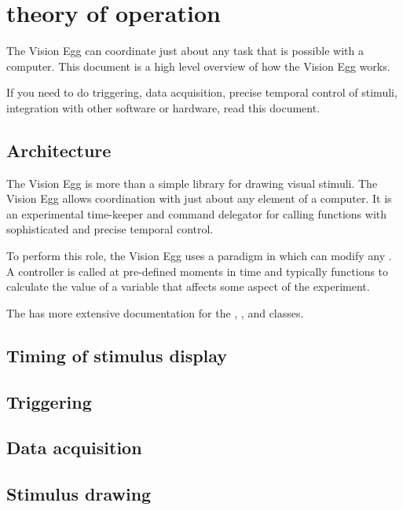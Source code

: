 \chapter{theory of operation \label{theory}}

The Vision Egg can coordinate just about any task that is possible
with a computer.  This document is a high level overview of how the
Vision Egg works.

If you need to do triggering, data acquisition, precise temporal
control of stimuli, integration with other software or hardware, read
this document.

\section{Architecture}

The Vision Egg is more than a simple library for drawing visual
stimuli. The Vision Egg allows coordination with just about any
element of a computer.  It is an experimental time-keeper and command
delegator for calling functions with sophisticated and precise
temporal control.

To perform this role, the Vision Egg uses a paradigm in which
 can modify any . A controller
is called at pre-defined moments in time and typically functions to
calculate the value of a variable that affects some aspect of the
experiment.

The  has more extensive documentation for the
, , and
 classes.

\section{Timing of stimulus display}

\section{Triggering}

\section{Data acquisition}

\section{Stimulus drawing}